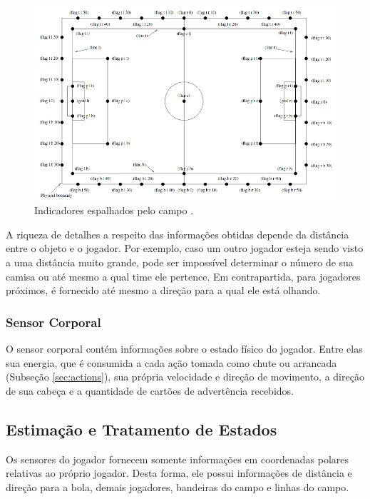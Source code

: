 \begin{figure}[H]
	\includegraphics[width=0.9\linewidth]{figs/flags.png}
	\centering
	\caption{Indicadores espalhados pelo campo  \cite{rcssmanual2003}.}
	\label{fig:flags}
\end{figure}

A riqueza de detalhes a respeito das informações obtidas depende da distância entre o objeto e o jogador. Por exemplo, caso um outro jogador esteja sendo visto a uma distância muito grande, pode ser impossível determinar o número de sua camisa ou até mesmo a qual time ele pertence. Em contrapartida, para jogadores próximos, é fornecido até mesmo a direção para a qual ele está olhando.

\subsubsection{Sensor Corporal}

O sensor corporal contém informações sobre o estado físico do jogador. Entre elas sua energia, que é consumida a cada ação tomada como chute ou arrancada (Subseção \ref{sec:actions}), sua própria velocidade e direção de movimento, a direção de sua cabeça e a quantidade de cartões de advertência recebidos.

\subsection{Estimação e Tratamento de Estados}

\par Os sensores do jogador fornecem somente informações em coordenadas polares relativas ao próprio jogador. Desta forma, ele possui informações de distância e direção para a bola, demais jogadores, bandeiras do campo e linhas do campo.

